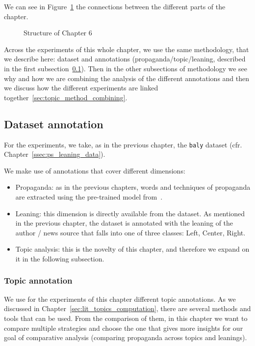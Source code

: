 We can see in Figure~\ref{fig:methodology_mindmap_chapter6} the connections between the different parts of the chapter.


\begin{figure}[!htbp]
    \centering
    \resizebox{\textwidth}{!}{
    \trimbox{2cm 1cm 2cm 1cm}{
    }}
    \caption{Structure of Chapter 6}
    \label{fig:methodology_mindmap_chapter6}
\end{figure}


Across the experiments of this whole chapter, we use the same methodology, that we describe here: dataset and annotations (propaganda/topic/leaning, described in the first subsection~\ref{sec:topic_method_data}).
Then in the other subsections of methodology we see why and how we are combining the analysis of the different annotations and then we discuss how the different experiments are linked together~\ref{sec:topic_method_combining}. %


\subsection{Dataset annotation}
\label{sec:topic_method_data}

For the experiments, we take, as in the previous chapter, the \texttt{baly} dataset (cfr. Chapter~\ref{ssec:ps_leaning_data}).

We make use of annotations that cover different dimensions:
\begin{itemize}
    \item Propaganda: as in the previous chapters, words and techniques of propaganda are extracted using the pre-trained model from~\cite{da2019fine}.
    \item Leaning: this dimension is directly available from the dataset. As mentioned in the previous chapter, the dataset is annotated with the leaning of the author / news source that falls into one of three classes: Left, Center, Right.
    \item Topic analysis: this is the novelty of this chapter, and therefore we expand on it in the following subsection. %
\end{itemize}



\subsubsection{Topic annotation}
We use for the experiments of this chapter different topic annotations. As we discussed in Chapter~\ref{sec:lit_topics_computation}, there are several methods and tools that can be used.
From the comparison of them, in this chapter we want to compare multiple strategies and choose the one that gives more insights for our goal of comparative analysis (comparing propaganda across topics and leanings).

